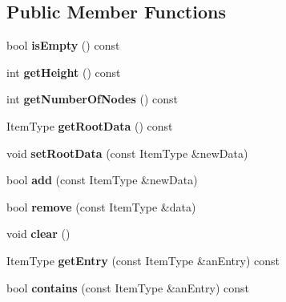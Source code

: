 \subsection*{Public Member Functions}
\begin{DoxyCompactItemize}
\item 
\hypertarget{class_binary_node_tree_ae3b5ffa874ac164a50dd9cd1eb43ca03}{}\label{class_binary_node_tree_ae3b5ffa874ac164a50dd9cd1eb43ca03} 
bool {\bfseries is\+Empty} () const
\item 
\hypertarget{class_binary_node_tree_a19f562021609b30955f808759f53ca8f}{}\label{class_binary_node_tree_a19f562021609b30955f808759f53ca8f} 
int {\bfseries get\+Height} () const
\item 
\hypertarget{class_binary_node_tree_a2be8730b32f32250c5feff576378d34a}{}\label{class_binary_node_tree_a2be8730b32f32250c5feff576378d34a} 
int {\bfseries get\+Number\+Of\+Nodes} () const
\item 
\hypertarget{class_binary_node_tree_ae8556653f8a673c5fe7a2404948e408f}{}\label{class_binary_node_tree_ae8556653f8a673c5fe7a2404948e408f} 
Item\+Type {\bfseries get\+Root\+Data} () const
\item 
\hypertarget{class_binary_node_tree_a2c839fd1f9eff387ea134792ecb8c34d}{}\label{class_binary_node_tree_a2c839fd1f9eff387ea134792ecb8c34d} 
void {\bfseries set\+Root\+Data} (const Item\+Type \&new\+Data)
\item 
\hypertarget{class_binary_node_tree_a0f98a30d162875a4d5ffedd40b658240}{}\label{class_binary_node_tree_a0f98a30d162875a4d5ffedd40b658240} 
bool {\bfseries add} (const Item\+Type \&new\+Data)
\item 
\hypertarget{class_binary_node_tree_a5c3383e6cde4f794028e2264cd8e9d3f}{}\label{class_binary_node_tree_a5c3383e6cde4f794028e2264cd8e9d3f} 
bool {\bfseries remove} (const Item\+Type \&data)
\item 
\hypertarget{class_binary_node_tree_a6ec544a0b10d9323b8008660825b98b7}{}\label{class_binary_node_tree_a6ec544a0b10d9323b8008660825b98b7} 
void {\bfseries clear} ()
\item 
\hypertarget{class_binary_node_tree_a0231a6e71abac98bb4cca6a0df444c46}{}\label{class_binary_node_tree_a0231a6e71abac98bb4cca6a0df444c46} 
Item\+Type {\bfseries get\+Entry} (const Item\+Type \&an\+Entry) const
\item 
\hypertarget{class_binary_node_tree_a73c482860c5dc6c0b8cec6af720f6cc9}{}\label{class_binary_node_tree_a73c482860c5dc6c0b8cec6af720f6cc9} 
bool {\bfseries contains} (const Item\+Type \&an\+Entry) const

\end{DoxyCompactItemize}

